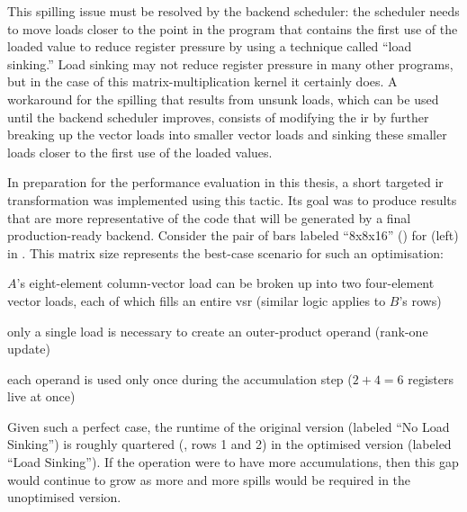 \documentclass[\main/thesis.tex]{subfiles}
\begin{document}
This spilling issue must be resolved by the backend scheduler: the scheduler needs to move loads closer to the \gls{point} in the program that contains the first use of the loaded value to reduce register pressure by using a technique called ``load sinking.''\footnotemark
{}
Load sinking may not reduce register pressure in many other programs, but in the case of this matrix-multiplication kernel it certainly does.
A workaround for the spilling that results from unsunk loads, which can be used until the backend scheduler improves, consists of modifying the \gls{ir} by further breaking up the vector loads into smaller vector loads and sinking these smaller loads closer to the first use of the loaded values.

In preparation for the performance evaluation in this thesis, a short targeted \gls{ir} transformation was implemented using this tactic.
Its goal was to produce results that are more representative of the code that will be generated by a final production-ready backend.
Consider the pair of bars labeled ``8x8x16'' () for  (left) in .
This matrix size represents the best-case scenario for such an optimisation:
\begin{enumerate*}[itemjoin={{; }}, itemjoin*={{; and }}, label={\protect\circled{\arabic*}}, after={.}]
  \item $A$'s eight-element column-vector load can be broken up into two four-element vector loads, each of which fills an entire \gls{vsr} (similar logic applies to $B$'s rows)
  \item only a single load is necessary to create an outer-product operand (rank-one update)
  \item each operand is used only once during the accumulation step ($2+4=6$ registers \gls{live} at once)
\end{enumerate*}
Given such a perfect case, the runtime of the original version (labeled ``No Load Sinking'') is roughly quartered (, rows 1 and 2) in the optimised version (labeled ``Load Sinking'').
If the operation were to have more accumulations, then this gap would continue to grow as more and more spills would be required in the unoptimised version.
\end{document}

